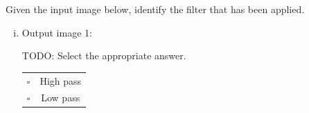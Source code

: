 \documentclass[11pt]{article}
\begin{document}
\begin{enumerate}[(a)]
\begin{tcolorbox}[colback=orange!5!white,colframe=orange!75!black]
Given the input image below, identify the filter that has been applied.
\end{tcolorbox}


\begin{enumerate}[(i)]
\item
Output image 1:\\
\begin{tcolorbox}[colback=white!5!white,colframe=green!75!black]
TODO: Select the appropriate answer. %

\begin{tabular}[h]{lc}
$\square$ & High pass \\
$\square$ & Low pass \\
\end{tabular}
\end{tcolorbox}


\end{enumerate}
\end{enumerate}
\end{document}
